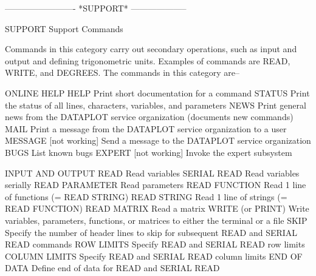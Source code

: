  
 
 
 
 
 
 
 
 
 
 
 
 
 
 
 
 
 
 
 
 
 
 
 
 
 
 
 
 
 
 
 
 
 
 
 
 
 
 
 
 
 
 
-------------------------  *SUPPORT*  --------------------
 
SUPPORT
Support Commands
 
Commands in this category carry out secondary operations, such as input
and output and defining trigonometric units.  Examples of commands are
READ, WRITE, and DEGREES.  The commands in this category are--
 
ONLINE HELP
   HELP                    Print short documentation for a command
   STATUS                  Print the status of all lines, characters,
                           variables, and parameters
   NEWS                    Print general news from the DATAPLOT service
                           organization (documents new commands)
   MAIL                    Print a message from the DATAPLOT service
                           organization to a user
   MESSAGE   [not working] Send a message to the DATAPLOT service
                           organization
   BUGS                    List known bugs
   EXPERT [not working]    Invoke the expert subsystem
 
INPUT AND OUTPUT
   READ                    Read variables
   SERIAL READ             Read variables serially
   READ PARAMETER          Read parameters
   READ FUNCTION           Read 1 line of functions (= READ STRING)
   READ STRING             Read 1 line of strings (= READ FUNCTION)
   READ MATRIX             Read a matrix
   WRITE (or PRINT)        Write variables, parameters, functions, or
                           matrices to either the terminal or a file
   SKIP                    Specify the number of header lines to skip
                           for subsequent READ and SERIAL READ commands
   ROW LIMITS              Specify READ and SERIAL READ row limits
   COLUMN LIMITS           Specify READ and SERIAL READ column limits
   END OF DATA             Define end of data for READ and SERIAL READ
 

